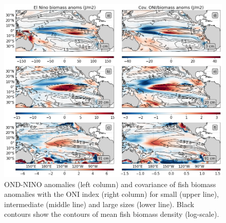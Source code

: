 \begin{figure}[h!tp]
	\centering
	\includegraphics[scale=0.4]{figs/map_mean_anom_OND_97.png}	
	\caption{OND-NINO anomalies (left column) and covariance of fish biomass anomalies with the ONI index (right column) for small (upper line), intermediate (middle line) and large sizes (lower line). Black contours show the contours of mean fish biomass density (log-scale).}	
	\label{fig:mean_ond97_ape}
\end{figure}

